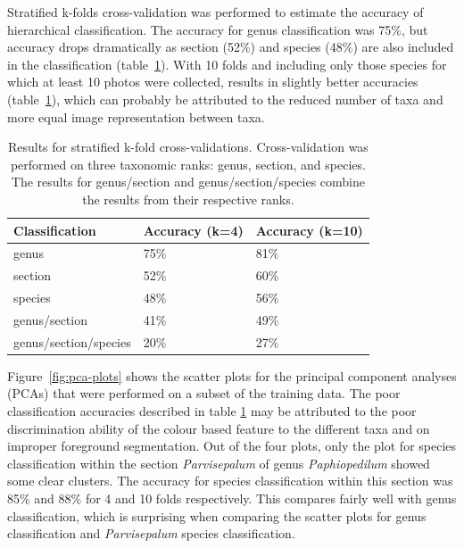\documentclass[twocolumn]{bmcart}
\begin{document}
Stratified k-folds cross-validation was performed to estimate the accuracy of hierarchical classification. The accuracy for genus classification was 75\%, but accuracy drops dramatically as section (52\%) and species (48\%) are also included in the classification (table~\ref{tbl:x-validation-results}). With 10 folds and including only those species for which at least 10 photos were collected, results in slightly better accuracies (table~\ref{tbl:x-validation-results}), which can probably be attributed to the reduced number of taxa and more equal image representation between taxa.

\begin{table}[h]\footnotesize
    \caption{Results for stratified k-fold cross-validations. Cross-validation was performed on three taxonomic ranks: genus, section, and species. The results for genus/section and genus/section/species combine the results from their respective ranks.}
    \begin{center}
    \begin{tabular}{lp{1.5cm}p{1.5cm}}
    \toprule
    \textbf{Classification} & \textbf{Accuracy (k=4)} & \textbf{Accuracy (k=10)} \\
    \midrule
    genus                   & 75\%    & 81\% \\
    section                 & 52\%    & 60\% \\
    species                 & 48\%    & 56\% \\
    genus/section           & 41\%    & 49\% \\
    genus/section/species   & 20\%    & 27\% \\
    \bottomrule
    \end{tabular}
    \end{center}
    \label{tbl:x-validation-results}
\end{table}

Figure~\ref{fig:pca-plots} shows the scatter plots for the principal component analyses (PCAs) that were performed on a subset of the training data. The poor classification accuracies described in table \ref{tbl:x-validation-results} may be attributed to the poor discrimination ability of the colour based feature to the different taxa and on improper foreground segmentation. Out of the four plots, only the plot for species classification within the section \textit{Parvisepalum} of genus \textit{Paphiopedilum} showed some clear clusters. The accuracy for species classification within this section was 85\% and 88\% for 4 and 10 folds respectively. This compares fairly well with genus classification, which is surprising when comparing the scatter plots for genus classification and \textit{Parvisepalum} species classification.
\end{document}
